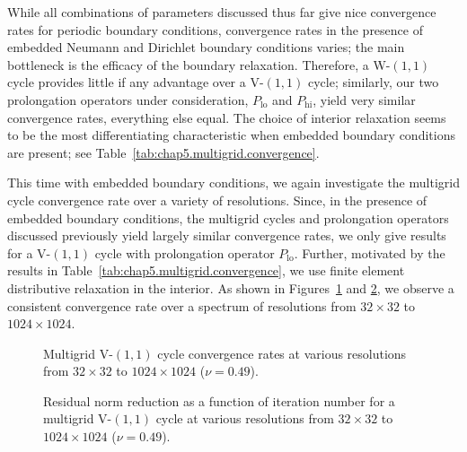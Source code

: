 While all combinations of parameters discussed thus far give nice convergence rates for periodic boundary conditions, convergence rates in the presence of embedded Neumann and Dirichlet boundary conditions varies; the main bottleneck is the efficacy of the boundary relaxation. Therefore, a W-$(1,1)$ cycle provides little if any advantage over a V-$(1,1)$ cycle; similarly, our two prolongation operators under consideration, $P_{\text{lo}}$ and $P_{\text{hi}}$, yield very similar convergence rates, everything else equal. The choice of interior relaxation seems to be the most differentiating characteristic when embedded boundary conditions are present; see Table~\ref{tab:chap5.multigrid.convergence}.

This time with embedded boundary conditions, we again investigate the multigrid cycle convergence rate over a variety of resolutions. Since, in the presence of embedded boundary conditions, the multigrid cycles and prolongation operators discussed previously yield largely similar convergence rates, we only give results for a V-$(1,1)$ cycle with prolongation operator $P_{\text{lo}}$. Further, motivated by the results in Table~\ref{tab:chap5.multigrid.convergence}, we use finite element distributive relaxation in the interior. As shown in Figures~\ref{fig:chap5.multigrid.convergence.flower.a} and \ref{fig:chap5.multigrid.convergence.flower.b}, we observe a consistent convergence rate over a spectrum of resolutions from $32 \times 32$ to $1024 \times 1024$.

\setlength{\figurewidth}{0.50\textwidth}
\begin{figure}[htbp]
\centering
{}
\caption{Multigrid V-$(1,1)$ cycle convergence rates at various resolutions from $32 \times 32$ to $1024 \times 1024$ ($\nu = 0.49$).}
\label{fig:chap5.multigrid.convergence.flower.a}
\end{figure}

\setlength{\figurewidth}{0.50\textwidth}
\begin{figure}[htbp]
\centering
{}
\caption{Residual norm reduction as a function of iteration number for a multigrid V-$(1,1)$ cycle at various resolutions from $32 \times 32$ to $1024 \times 1024$ ($\nu = 0.49$).}
\label{fig:chap5.multigrid.convergence.flower.b}
\end{figure}

